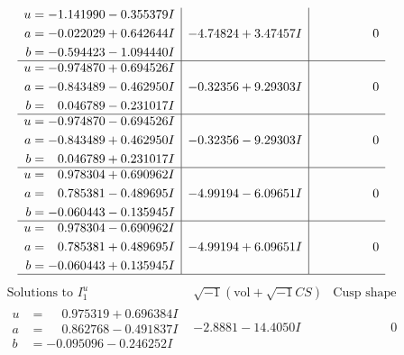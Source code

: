 \documentclass[1p]{elsarticle_modified}
\theoremstyle{definition}
\newcommand{\I}{\sqrt{-1}}
\begin{document}
$$\begin{array}{c|c|c}
\begin{aligned}
u &= -1.141990 - 0.355379 I \\
a &= -0.022029 + 0.642644 I \\
b &= -0.594423 - 1.094440 I\end{aligned}
 & -4.74824 + 3.47457 I & \phantom{-0.000000 } 0 \\ \hline\begin{aligned}
u &= -0.974870 + 0.694526 I \\
a &= -0.843489 - 0.462950 I \\
b &= \phantom{-}0.046789 - 0.231017 I\end{aligned}
 & -0.32356 + 9.29303 I & \phantom{-0.000000 } 0 \\ \hline\begin{aligned}
u &= -0.974870 - 0.694526 I \\
a &= -0.843489 + 0.462950 I \\
b &= \phantom{-}0.046789 + 0.231017 I\end{aligned}
 & -0.32356 - 9.29303 I & \phantom{-0.000000 } 0 \\ \hline\begin{aligned}
u &= \phantom{-}0.978304 + 0.690962 I \\
a &= \phantom{-}0.785381 - 0.489695 I \\
b &= -0.060443 - 0.135945 I\end{aligned}
 & -4.99194 - 6.09651 I & \phantom{-0.000000 } 0 \\ \hline\begin{aligned}
u &= \phantom{-}0.978304 - 0.690962 I \\
a &= \phantom{-}0.785381 + 0.489695 I \\
b &= -0.060443 + 0.135945 I\end{aligned}
 & -4.99194 + 6.09651 I & \phantom{-0.000000 } 0\\
 \hline 
 \end{array}$$\newpage$$\begin{array}{c|c|c}  
\text{Solutions to }I^u_{1}& \I (\text{vol} + \sqrt{-1}CS) & \text{Cusp shape}\\
 \hline 
\begin{aligned}
u &= \phantom{-}0.975319 + 0.696384 I \\
a &= \phantom{-}0.862768 - 0.491837 I \\
b &= -0.095096 - 0.246252 I\end{aligned}
 & -2.8881 - 14.4050 I & \phantom{-0.000000 } 0 \\ \hline\begin{aligned}

\end{aligned}
\end{array}$$
\end{document}
